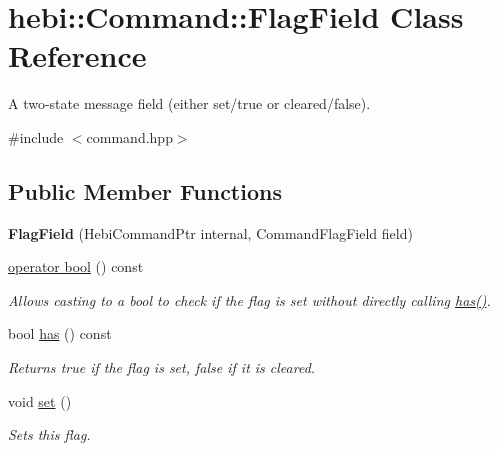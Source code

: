 \hypertarget{classhebi_1_1Command_1_1FlagField}{}\section{hebi\+:\+:Command\+:\+:Flag\+Field Class Reference}
\label{classhebi_1_1Command_1_1FlagField}


A two-\/state message field (either set/true or cleared/false).  




{\ttfamily \#include $<$command.\+hpp$>$}

\subsection*{Public Member Functions}
\begin{DoxyCompactItemize}
\item 
\mbox{\label{classhebi_1_1Command_1_1FlagField_a4252702a9af7fe9b656d360d8ff7f14e}} 
{\bfseries Flag\+Field} (Hebi\+Command\+Ptr internal, Command\+Flag\+Field field)
\item 
\hyperlink{classhebi_1_1Command_1_1FlagField_afbe105fefc252d9a0036bc540729287b}{operator bool} () const
\begin{DoxyCompactList}\small\item\em Allows casting to a bool to check if the flag is set without directly calling {\ttfamily \hyperlink{classhebi_1_1Command_1_1FlagField_aa1493ce350be33e099dde81586e9ac3c}{has()}}. \end{DoxyCompactList}\item 
\mbox{\label{classhebi_1_1Command_1_1FlagField_aa1493ce350be33e099dde81586e9ac3c}} 
bool \hyperlink{classhebi_1_1Command_1_1FlagField_aa1493ce350be33e099dde81586e9ac3c}{has} () const
\begin{DoxyCompactList}\small\item\em Returns {\ttfamily true} if the flag is set, false if it is cleared. \end{DoxyCompactList}\item 
\mbox{\label{classhebi_1_1Command_1_1FlagField_a51fa751950973f51359f628b2714b683}} 
void \hyperlink{classhebi_1_1Command_1_1FlagField_a51fa751950973f51359f628b2714b683}{set} ()
\begin{DoxyCompactList}\small\item\em Sets this flag. \end{DoxyCompactList}\item 

\end{DoxyCompactItemize}
